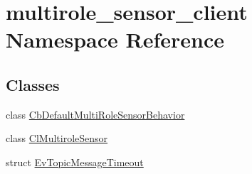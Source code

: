 \hypertarget{namespacemultirole__sensor__client}{}\section{multirole\+\_\+sensor\+\_\+client Namespace Reference}
\label{namespacemultirole__sensor__client}
\subsection*{Classes}
\begin{DoxyCompactItemize}
\item 
class \hyperlink{classmultirole__sensor__client_1_1CbDefaultMultiRoleSensorBehavior}{Cb\+Default\+Multi\+Role\+Sensor\+Behavior}
\item 
class \hyperlink{classmultirole__sensor__client_1_1ClMultiroleSensor}{Cl\+Multirole\+Sensor}
\item 
struct \hyperlink{structmultirole__sensor__client_1_1EvTopicMessageTimeout}{Ev\+Topic\+Message\+Timeout}
\end{DoxyCompactItemize}
